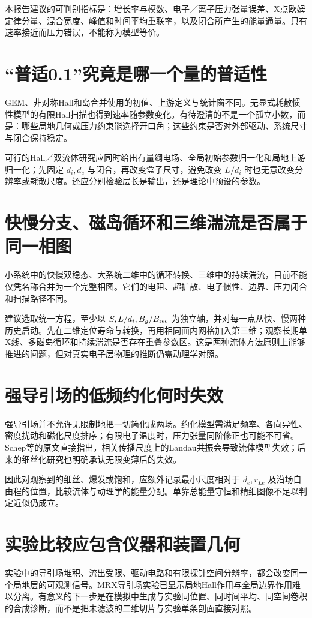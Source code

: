 本报告建议的可判别指标是：增长率与模数、电子／离子压力张量误差、X点欧姆定律分量、混合宽度、峰值和时间平均重联率，以及闭合所产生的能量通量。只有速率接近而压力错误，不能称为模型等价。

\section{“普适0.1”究竟是哪一个量的普适性}
GEM、非对称Hall和岛合并使用的初值、上游定义与统计窗不同。无显式耗散惯性模型的有限Hall扫描也得到速率随参数变化。\citep{Birn2001,Cassak2008,Ng2015,Andres2016}有待澄清的不是一个孤立小数，而是：哪些局地几何或压力约束能选择开口角；这些约束是否对外部驱动、系统尺寸与闭合保持稳定。

可行的Hall／双流体研究应同时给出有量纲电场、全局初始参数归一化和局地上游归一化；先固定 $d_i,d_e$ 与闭合，再改变盒子尺寸，避免改变 $L/d_i$ 时也无意改变分辨率或耗散尺度。还应分别检验层长是输出，还是理论中预设的参数。

\section{快慢分支、磁岛循环和三维湍流是否属于同一相图}
小系统中的快慢双稳态、大系统二维中的循环转换、三维中的持续湍流，目前不能仅凭名称合并为一个完整相图。\citep{Cassak2005,Cassak2010,Huang2011,Huang2024}它们的电阻、超扩散、电子惯性、边界、压力闭合和扫描路径不同。

建议选取统一方程，至少以 $S,L/d_i,B_g/B_{\rm rec}$ 为独立轴，并对每一点从快、慢两种历史启动。先在二维定位寿命与转换，再用相同面内网格加入第三维；观察长期单X线、多磁岛循环和持续湍流是否存在重叠参数区。这是两种流体方法原则上能够推进的问题，但对真实电子层物理的推断仍需动理学对照。

\section{强导引场的低频约化何时失效}
强导引场并不允许无限制地把一切简化成两场。约化模型需满足频率、各向异性、密度扰动和磁化尺度排序；有限电子温度时，压力张量同阶修正也可能不可省。Schep等的原文直接指出，相关传播尺度上的Landau共振会导致流体模型失效；后来的细丝化研究也明确承认无限变薄后的失效。\citep{Schep1994,L049}

因此对观察到的细丝、爆发或饱和，应额外记录最小尺度相对于 $d_e,r_{Le}$ 及沿场自由程的位置，比较流体与动理学的能量分配。单靠总能量守恒和精细图像不足以判定近似仍成立。

\section{实验比较应包含仪器和装置几何}
实验中的导引场堆积、流出受限、驱动电路和有限探针空间分辨率，都会改变同一个局地层的可观测信号。MRX导引场实验已显示局地Hall作用与全局边界作用难以分离。\citep{GuideExp2012}有意义的下一步是在模拟中生成与实验同位置、同时间平均、同空间卷积的合成诊断，而不是把未滤波的二维切片与实验单条剖面直接对照。


